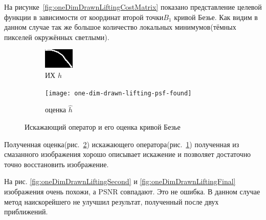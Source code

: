 На рисунке~\ref{fig:oneDimDrawnLiftingCostMatrix} показано представление целевой функции в зависимости от координат второй точки$B_1$ кривой Безье. Как видим в данном случае так же большое количество локальных минимумов(тёмных пикселей окружённых светлыми).

\begin{figure}[H]
	\centering
	\begin{subfigure}[t]{0.475\textwidth}
		\centering
		\includegraphics[width=0.3\linewidth]{../input/drawn-psf3}
		\caption{ИХ $h$}
		\label{fig:drawnPsf3Orig}
	\end{subfigure}
	\begin{subfigure}[t]{0.15\textwidth}
		\centering
		\texttt{[image: one-dim-drawn-lifting-psf-found]}
		\caption{оценка $\hat{h}$}
		\label{fig:drawnPsf3Estimation}
		
	\end{subfigure}
	\caption{Искажающий оператор и его оценка кривой Безье}
	\label{fig:drawnPsf3Est}
\end{figure}

Полученная оценка(рис.~\ref{fig:drawnPsf3Estimation}) искажающего оператора(рис.~\ref{fig:drawnPsf3Orig}) полученная из смазанного изображения хорошо описывает искажение и позволяет достаточно точно восстановить изображение.

На рис. \ref{fig:oneDimDrawnLiftingSecond} и \ref{fig:oneDimDrawnLiftingFinal} изображения очень похожи, а PSNR совпадают. Это не ошибка. В данном случае метод наискорейшего не улучшил результат, полученный после двух приближений.

